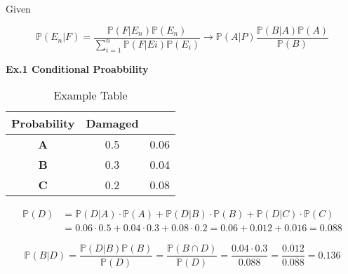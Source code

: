                         Given 
            
                        \begin{equation}
                            \mathbb{P} (E_n | F) = \frac{\mathbb{P} (F| E_n) \mathbb{P} (E_n)}{\sum^{n}_{i=1} \mathbb{P} (F|Ei) \mathbb{P} (E_i)} \rightarrow \mathbb{P} (A|P) \frac{\mathbb{P} (B|A) \mathbb{P} (A)}{\mathbb{P} (B)}
                        \end{equation}
            
            


            \textbf{Ex.1 Conditional Proabbility}

            \begin{table}[h!]
                \centering
                \begin{tabular}{|c|c|c|}
                    \hline
                    \textbf{Probability} & \textbf{Damaged} \\
                    \hline
                    \textbf{A}  & 0.5 & 0.06 \\
                    \hline
                    \textbf{B}  & 0.3 & 0.04 \\
                    \hline
                    \textbf{C}  & 0.2 & 0.08 \\
                    \hline
                \end{tabular}
                \caption{Example Table}
                \label{tab:example}
            \end{table}
            
            \begin{equation}
            \begin{split}
                \mathbb{P} (D) & = \mathbb{P} (D|A) \cdot \mathbb{P} (A) + \mathbb{P} (D|B) \cdot \mathbb{P} (B) + \mathbb{P} (D|C) \cdot \mathbb{P} (C) \\
                & = 0.06 \cdot 0.5 + 0.04 \cdot 0.3 + 0.08 \cdot 0.2 = 0.06 + 0.012 + 0.016 = 0.088
            \end{split}
            \end{equation}
            
            \begin{equation}
                \mathbb{P} (B|D) = \frac{\mathbb{P}(D|B) \mathbb{P}(B) }{\mathbb{P}(D)} = \frac{\mathbb{P} (B \cap D)}{\mathbb{P} (D)} = \frac{0.04 \cdot 0.3}{0.088} = \frac{0.012}{0.088} = 0.136
            \end{equation}
            
